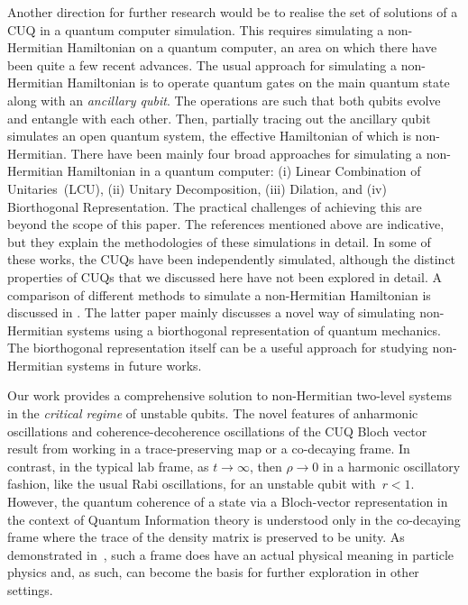 \documentclass[12pt,a4paper]{article}
\begin{document}
Another direction for further research would be to realise the set of solutions of a CUQ in a quantum computer simulation. This requires simulating a non-Hermitian Hamiltonian on a quantum computer, an area on which there have been quite a few recent advances\cite{Zhang:2020iqa,Dogra:2021omk,Koukoutsis:2024teg,Jebraeilli:2025zrm}. The usual approach for simulating a non-Hermitian Hamiltonian is to operate quantum gates on the main quantum state along with an {\em ancillary qubit}. The operations are such that both qubits evolve and entangle with each other. Then, partially tracing out the ancillary qubit simulates an open quantum system, the effective Hamiltonian of which is non-Hermitian. There have been mainly four broad approaches for simulating a non-Hermitian Hamiltonian in a quantum computer:  (i) Linear Combination of Unitaries~(LCU), (ii) Unitary Decomposition, (iii) Dilation, and (iv) Biorthogonal Representation\cite{Koukoutsis:2024teg}. The practical challenges of achieving this are beyond the scope of this paper. The references mentioned above are indicative, but they explain the methodologies of these simulations in detail. In some of these works, the CUQs have been independently simulated\cite{Zhang:2020iqa,Dogra:2021omk,Jebraeilli:2025zrm}, although the distinct properties of CUQs that we discussed here have not been explored in detail. A comparison of different methods to simulate a non-Hermitian Hamiltonian is discussed in \cite{Koukoutsis:2024teg}. The latter paper mainly discusses a novel way of simulating non-Hermitian systems using a biorthogonal representation of quantum mechanics\cite{Brody:2013axr}. The biorthogonal representation itself can be a useful approach for studying non-Hermitian systems in future works.

Our work provides a comprehensive solution to non-Hermitian two-level systems in the {\em critical regime} of unstable qubits. The novel features of anharmonic oscillations and coherence-decoherence oscillations of the CUQ Bloch vector result from working in a trace-preserving map or a co-decaying frame. In contrast, in the typical lab frame, as $t\rightarrow\infty$, then $\rho\rightarrow 0$ in a harmonic oscillatory fashion, like the usual Rabi oscillations, for an unstable qubit with~${r<1}$. However, the quantum coherence of a state via a Bloch-vector representation in the context of Quantum Information theory is understood only in the co-decaying frame where the trace of the density matrix is preserved to be unity. As demonstrated in~\cite{Karamitros:2025azy}, such a frame does have an actual physical meaning in particle physics and, as such, can become the basis for further exploration in other settings. 
\end{document}
